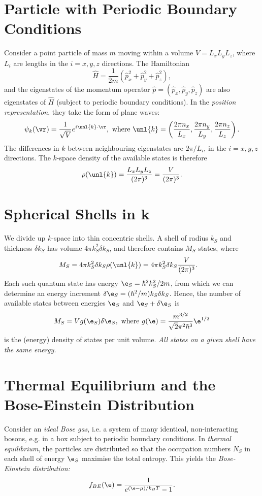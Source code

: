 \documentclass[a4paper, 11pt, normalem]{report}
\begin{document}
\section{Particle with Periodic Boundary Conditions}
Consider a point particle of mass $m$ moving within a volume $V=L_xL_yL_z$, where $L_i$ are lengths in the $i=x,y,z$ directions.
The Hamiltonian
\begin{equation}
    \hat{H} = \frac{1}{2m}\left(\hat{p}_x^2+\hat{p}_y^2+\hat{p}_z^2\right),
\end{equation}
and the eigenstates of the momentum operator $\hat{p}=(\hat{p}_x,\hat{p}_y,\hat{p}_z)$ are also eigenstates of $\hat{H}$ (subject to periodic boundary conditions).
In the \emph{position representation}, they take the form of plane waves:
\begin{align}
    \psi_k(\vr) = \frac{1}{\sqrt{V}}e^{i\unl{k}\cdot\vr}, \text{ where } \unl{k} = \left(\frac{2\pi n_x}{L_x},\frac{2\pi n_y}{L_y},\frac{2\pi n_z}{L_z}\right).
\end{align}
The differences in $k$ between neighbouring eigenstates are $2\pi/L_i$, in the $i=x,y,z$ directions.
The $k$-space density of the available states is therefore
\begin{align}
    \rho(\unl{k}) = \frac{L_xL_yL_z}{(2\pi)^3} = \frac{V}{(2\pi)^3}.
\end{align}

\section{Spherical Shells in k}
We divide up $k$-space into thin concentric shells.
A shell of radius $k_S$ and thickness $\delta k_S$ has volume $4\pi k_S^2\delta k_S$, and therefore contains $M_S$ states, where
\begin{align}
    M_S &= 4\pi k_S^2\delta k_S\rho(\unl{k}) = 4\pi k_S^2\delta k_S \frac{V}{(2\pi)^3}.
\end{align}
Each such quantum state has energy $\e_S=\hbar^2k_S^2/2m$, from which we can determine an energy increment $\delta\e_S=(\hbar^2/m)k_S\delta k_S$.
Hence, the number of available states between energies $\e_S$ and $\e_S+\delta\e_S$ is
\begin{align}
    M_S = Vg(\e_S)\delta\e_S, \text{ where } g(\e) = \frac{m^{3/2}}{\sqrt{2}\pi^2\hbar^3}\e^{1/2}
\end{align}
is the (energy) density of states per unit volume.
\emph{All states on a given shell have the same energy.}

\section{Thermal Equilibrium and the Bose-Einstein Distribution}
Consider an \emph{ideal Bose gas}, i.e. a system of many identical, non-interacting bosons, e.g. in a box subject to periodic boundary conditions.
In \emph{thermal equilibrium}, the particles are distributed so that the occupation numbers $N_S$ in each shell of energy $\e_S$ maximise the total entropy.
This yields the \emph{Bose-Einstein distribution:}
\begin{align}
    f_{BE}(\e) = \frac{1}{e^{(\e-\mu)/k_BT}-1}.
\end{align}
\end{document}
